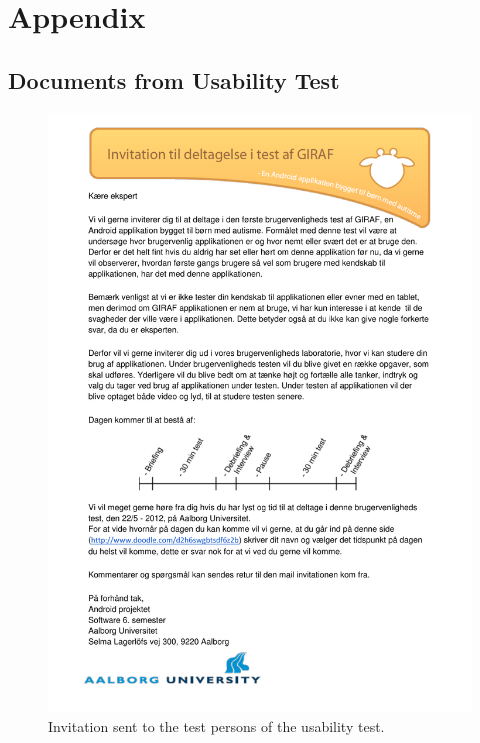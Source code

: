 \chapter*{Appendix}

\section{Documents from Usability Test}
\label{app:usability_documents}
	\begin{figure}%
		\begin{center}
			\includegraphics[width=\textwidth]{Appendix/invitation_to_usability_test.pdf}
		\end{center}
		\caption{Invitation sent to the test persons of the usability test.}
		\label{appendice:usability_test}
	\end{figure}
	
